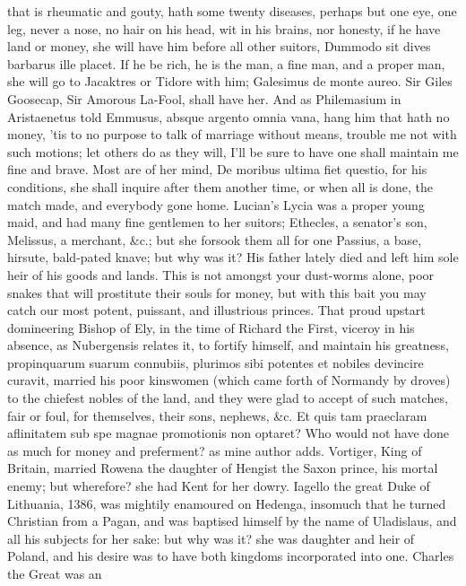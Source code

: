 {that is rheumatic and gouty, hath some twenty diseases, perhaps but one
eye, one leg, never a nose, no hair on his head, wit in his brains, nor
honesty, if he have land or money, she will have him before all
other suitors, Dummodo sit dives barbarus ille placet. If he be
rich, he is the man, a fine man, and a proper man, she will go to
Jacaktres or Tidore with him; Galesimus de monte aureo. Sir Giles
Goosecap, Sir Amorous La-Fool, shall have her. And as Philemasium in
 Aristaenetus told Emmusus, absque argento omnia vana, hang him
that hath no money, 'tis to no purpose to talk of marriage without
means,  trouble me not with such motions; let others do as they
will, I'll be sure to have one shall maintain me fine and brave. Most
are of her mind,  De moribus ultima fiet questio, for his
conditions, she shall inquire after them another time, or when all is
done, the match made, and everybody gone home. Lucian's Lycia was
a proper young maid, and had many fine gentlemen to her suitors;
Ethecles, a senator's son, Melissus, a merchant, \&c.; but she forsook
them all for one Passius, a base, hirsute, bald-pated knave; but why
was it? His father lately died and left him sole heir of his goods and
lands. This is not amongst your dust-worms alone, poor snakes that will
prostitute their souls for money, but with this bait you may catch our
most potent, puissant, and illustrious princes. That proud upstart
domineering Bishop of Ely, in the time of Richard the First, viceroy in
his absence, as Nubergensis relates it, to fortify himself, and
maintain his greatness, propinquarum suarum connubiis, plurimos sibi
potentes et nobiles devincire curavit, married his poor kinswomen
(which came forth of Normandy by droves) to the chiefest nobles of the
land, and they were glad to accept of such matches, fair or foul, for
themselves, their sons, nephews, \&c. Et quis tam praeclaram aflinitatem
sub spe magnae promotionis non optaret? Who would not have done as much
for money and preferment? as mine author adds. Vortiger, King of
Britain, married Rowena the daughter of Hengist the Saxon prince, his
mortal enemy; but wherefore? she had Kent for her dowry. Iagello the
great Duke of Lithuania, 1386, was mightily enamoured on Hedenga,
insomuch that he turned Christian from a Pagan, and was baptised
himself by the name of Uladislaus, and all his subjects for her sake:
but why was it? she was daughter and heir of Poland, and his desire was
to have both kingdoms incorporated into one. Charles the Great was an
}
